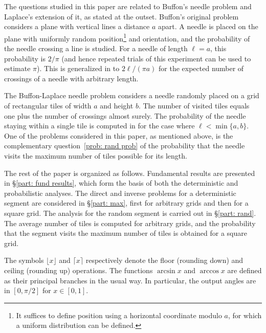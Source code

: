 \documentclass[12pt, a4paper]{article}
\newcommand{\len}{\ell} %
\begin{document}

The questions studied in this paper are related to Buffon's needle problem and Laplace's extension of it, as stated at the outset. Buffon's original problem considers a plane with vertical lines a distance $a$ apart. A needle is placed on the plane with uniformly random position\footnote{It suffices to define position using a horizontal coordinate modulo $a$, for which a uniform distribution can be defined.} and orientation, and the probability of the needle crossing a line is studied. For a needle of length $\len = a$, this probability is $2/\pi$ (and hence repeated trials of this experiment can be used to estimate $\pi$). This is generalized in \cite{Ramaley69} to $2\len /(\pi a)$ for the expected number of crossings of a needle with arbitrary length.

The Buffon-Laplace needle problem \cite[section~1.1]{Mathai99} considers a needle randomly placed on a grid of rectangular tiles of width $a$ and height $b$. The number of visited tiles equals one plus the number of crossings almost surely. The probability of the needle staying within a single tile is computed in \cite{Arnow94} for the case where $\len < \min\{a,b\}$. One of the problems considered in this paper, as mentioned above, is the complementary question~\ref{prob: rand prob} of the probability that the needle visits the maximum number of tiles possible for its length.

The rest of the paper is organized as follows. Fundamental results are presented in \S\ref{part: fund results}, which form the basis of both the deterministic and probabilistic analyses. The direct and inverse problems for a deterministic segment are considered in \S\ref{part: max}, first for arbitrary grids and then for a square grid. The analysis for the random segment is carried out in \S\ref{part: rand}. The average number of tiles is computed for arbitrary grids, and the probability that the segment visits the maximum number of tiles is obtained for a square grid.

The symbols $\lfloor x \rfloor$ and $\lceil x \rceil$ respectively denote the floor (rounding down) and ceiling (rounding up) operations. The functions $\arcsin x$ and $\arccos x$ are defined as their principal branches in the usual way. In particular, the output angles are in $[0, \pi/2]$ for $x \in [0,1]$.
\end{document}
